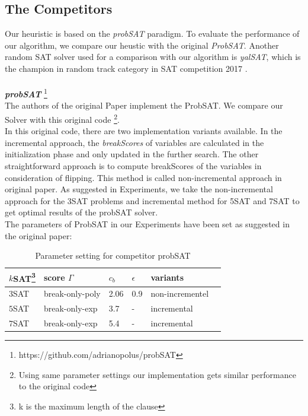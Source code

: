 \documentclass[12pt,a4paper,twoside]{scrartcl}
\numberwithin{equation}{section}
\begin{document}
\subsection{The Competitors}
\label{comparision}
Our heuristic is based on the \emph{probSAT} paradigm. To evaluate the performance of our algorithm, we compare our heustic with the original \emph{ProbSAT}. Another random SAT solver used for a comparison with our algorithm is \emph{yalSAT}, which is the champion in random track category in SAT competition 2017 \cite{biere2014yet}.\\
\\
\emph{\textbf{probSAT}} \footnote{https://github.com/adrianopolus/probSAT}
\\
The authors of the original Paper implement the ProbSAT. We compare our Solver with this original code \footnote{Using same parameter settings our implementation gets similar performance to the original code}.  \\
In this original code, there are two implementation variants available. In the incremental approach, the \emph{breakScores} of variables are calculated in the initialization phase and only updated in the further search. The other straightforward approach is to compute breakScores of the variables in consideration of flipping. This method is called non-incremental approach in original paper. As suggested in Experiments, we take the non-incremental approach for the 3SAT problems and incremental method for 5SAT and 7SAT to get optimal results of the probSAT solver.\\
The parameters of ProbSAT in our Experiments have been set as suggested in the original paper:\\
\begin{table}[h!]
\begin{center}
    \begin{tabular}{| l | l| l | l| l |p{3cm}|}
\hline 
    $k$SAT\footnote{k is the maximum length of the clause} & score $\Gamma$ & $c_b$ & $\epsilon$ &variants \\ \hline
    $3$SAT & break-only-poly& 2.06 & 0.9 &non-incrementel \\ \hline
    $5$SAT & break-only-exp & 3.7 & - & incremental \\ \hline
    $7$SAT &  break-only-exp & 5.4 & - & incremental \\ \hline
\end{tabular}
\caption[probSAT]{Parameter setting for competitor probSAT}
\end{center}
\end{table} 
\end{document}
